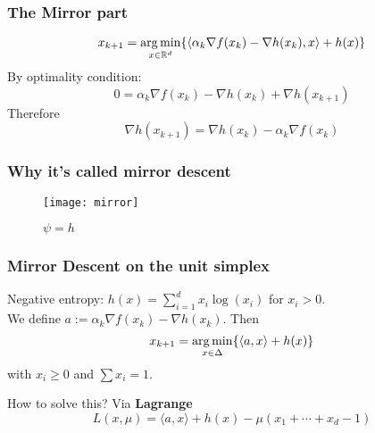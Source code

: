 \documentclass{beamer}
\begin{document}
\begin{frame}
  \frametitle{The Mirror part}
  \begin{equation}
    x_{k+1} = \operatorname*{arg\,min}_{x\in \mathbb{R}^d} \{ \langle \alpha_k \nabla f(x_k) - \nabla h(x_k), x \rangle + h(x) \}
  \end{equation}
  By optimality condition:
  \begin{equation}
    0 = \alpha_k \nabla f(x_k) - \nabla h(x_k) + \nabla h(x_{k+1})
  \end{equation}
  Therefore
  \begin{equation}
    \nabla h(x_{k+1}) =  \nabla h(x_k)  - \alpha_k \nabla f(x_k)
  \end{equation}

\end{frame}

\begin{frame}
  \frametitle{Why it's called mirror descent}
  \begin{figure}[ht]
    \centering
    \texttt{[image: mirror]}
    \caption{$\psi = h$}
  \end{figure}
\end{frame}


\begin{frame}
  \frametitle{Mirror Descent on the unit simplex}
    Negative entropy: $h(x) = \sum_{i=1}^{d} x_i \log(x_i)$ for $ x_i > 0$. \\
    We define $a := \alpha_k \nabla f(x_k) - \nabla h(x_k)$. Then
    \begin{equation}
      x_{k+1} = \operatorname*{arg\,min}_{x \in \Delta} \{ \langle a, x \rangle + h(x)\}
    \end{equation}
    with $x_i \ge 0$ and $\sum x_i = 1$.
    \begin{block}{How to solve this?}
      Via \textbf{Lagrange }
      \begin{equation}
        L(x,\mu) = \langle a, x \rangle + h(x) - \mu (x_1+\cdots+ x_d -1)
      \end{equation}
    \end{block}
\end{frame}
\end{document}
